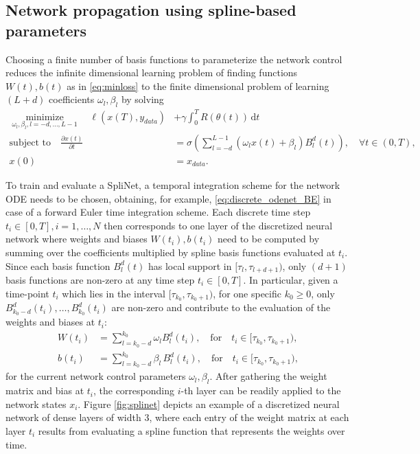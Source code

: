\documentclass[12pt]{amsart}
\def\minimize{\operatorname*{minimize}}
\begin{document}
\subsection{Network propagation using spline-based parameters}

Choosing a finite number of basis functions to parameterize the network control reduces the infinite dimensional learning problem of finding functions $W(t), b(t)$ as in \eqref{eq:minloss} to the finite dimensional problem of learning $(L+d)$ coefficients $\omega_l, \beta_l$ by solving
    \begin{align}
    \minimize_{\omega_l, \beta_l, l=-d,\dots,L-1} \quad  \ell(x(T), y_{data})& + \gamma\int_0^T R(\theta(t)) \, \mathrm{d}t \\
  \text{subject to} \quad
  \frac{\partial x(t)}{\partial t} &= \sigma\left(\sum_{l=-d}^{L-1} \left(\omega_l x(t) + \beta_l \right)B^d_l(t)\right), \quad \forall t\in (0,T),\\  x(0) &= x_{data}.
\end{align}


To train and evaluate a SpliNet, a temporal integration scheme for the network ODE needs to be chosen, obtaining, for example, \eqref{eq:discrete_odenet_BE} in case of a forward Euler time integration scheme.
Each discrete time step $t_i \in [0,T], i=1,\dots,N$ then corresponds to one layer of the discretized neural network where weights and biases $W(t_i), b(t_i)$ need to be computed by summing over the coefficients multiplied by spline basis functions evaluated at $t_i$.
Since each basis function $B^d_l(t)$ has local support in $[\tau_l, \tau_{l+d+1})$, only $(d+1)$ basis functions are non-zero at any time step $t_i\in [0,T]$. In particular, given a time-point $t_i$ which lies in the interval $[\tau_{k_0}, \tau_{k_0+1})$, for one specific $k_0 \geq 0$, only $B^d_{k_0-d}(t_i), \dots, B^d_{k_0}(t_i)$ are non-zero and contribute to the evaluation of the weights and biases at $t_i$:
    \begin{align}
    \label{eq:wb_bspline_compact}
        W(t_i) &= \sum_{l=k_0-d}^{k_0} \omega_l B^d_l(t_i), \quad \text{for} \quad t_i \in [\tau_{k_0},\tau_{k_0+1}), \\
        b(t_i) &= \sum_{l=k_0-d}^{k_0} \beta_l\, B^d_l(t_i), \quad \text{for} \quad t_i \in [\tau_{k_0},\tau_{k_0+1}),
    \end{align}
for the current network control parameters $\omega_l, \beta_l$.
After gathering the weight matrix and bias at $t_i$, the corresponding $i$-th layer can be readily applied to the network states $x_i$.
Figure \ref{fig:splinet} depicts an example of a discretized neural network of dense layers of width $3$, where each entry of the weight matrix at each layer $t_i$ results from evaluating a spline function that represents the weights over time.
\end{document}
